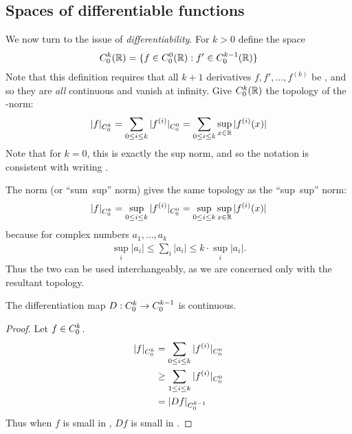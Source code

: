     \subsection{Spaces of differentiable functions}
      We now turn to the issue of \emph{differentiability}.
      For $k>0$ define the space 
      \begin{align*}
        {C^k_0}(\mathbb{R}) = \{f\in {C^0_0}(\mathbb{R}) : f'\in {C^{k-1}_0}(\mathbb{R})\}
      \end{align*}
      Note that this definition requires that all $k+1$ derivatives $f,f',\ldots,f^{(k)}$ be \Coo, and so they are \emph{all} continuous and vanish at infinity.
      Give ${C^k_0}(\mathbb{R})$ the topology of the \Cko-norm:
      \begin{align*}
        |f|_{C^k_0} = \sum_{0\le i\le k} |f^{(i)}|_{C^0_0} = \sum_{0\le i\le k} \sup_{x\in\mathbb{R}}|f^{(i)}(x)|
      \end{align*}
      Note that for $k=0$, this is exactly the sup norm, and so the notation \Cko is consistent with writing \Coo.
      \begin{rmk}
        The \Cko norm (or ``sum~sup'' norm) gives the same topology as the ``sup~sup'' norm:
        \begin{align*}
          |f|_{C^k_0}=\sup_{0\le i\le k}|f^{(i)}|_{C^0_0}=\sup_{0\le i\le k}\sup_{x\in\mathbb{R}}|f^{(i)}(x)|
        \end{align*}
        because for complex numbers $a_1,\ldots,a_k$
        \begin{align*}
          \sup_i |a_i| \le \sum_i |a_i| \le k\cdot\sup_i |a_i|\text{.}
        \end{align*}
        Thus the two can be used interchangeably, as we are concerned only with the resultant topology.
      \end{rmk}
      \begin{claim}
        \label{claim:diffcontCk0}
        The differentiation map $D:{C^k_0}\rightarrow{C^{k-1}_0}$ is continuous.
        \begin{proof}
          Let $f\in {C^k_0}$.
          \begin{align*}
            |f|_{C^k_0}
            &= \sum_{0\le i\le k} |f^{(i)}|_{C^0_0}
            \\&\ge \sum_{1\le i\le k} |f^{(i)}|_{C^0_0}
            \\&= |Df|_{C^{k-1}_0}
          \end{align*}
          Thus when $f$ is small in \Cko, $Df$ is small in \Ckmo.
        \end{proof}
      \end{claim}
